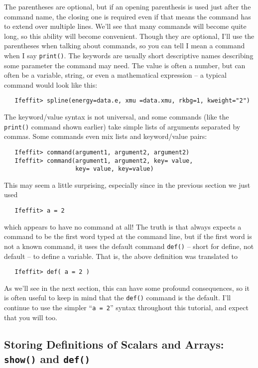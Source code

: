 \documentclass[11pt]{article}
\begin{document}
The parentheses are optional, but if an opening parenthesis is used just
after the command name, the closing one is required even if that means the
command has to extend over multiple lines.  We'll see that many commands
will become quite long, so this ability will become convenient.  Though
they are optional, I'll use the parentheses when talking about commands, so
you can tell I mean a command when I say {\tt{print()}}.  The keywords are
usually short descriptive names describing some parameter the command may
need.  The value is often a number, but can often be a variable, string, or
even a mathematical expression -- a typical command would look like this:
{\small\begin{verbatim}
   Ifeffit> spline(energy=data.e, xmu =data.xmu, rkbg=1, kweight="2")
\end{verbatim}}
\noindent
The {{keyword/value}} syntax is not universal, and some commands (like the
{\tt{print()}} command shown earlier) take simple lists of arguments
separated by commas.  Some commands even mix lists and {{keyword/value}}
pairs:
{\small\begin{verbatim}
   Ifeffit> command(argument1, argument2, argument2)
   Ifeffit> command(argument1, argument2, key= value, 
                    key= value, key=value)
\end{verbatim}}
\noindent
This may seem a little surprising, especially since in the previous section
we just used  
{\small\begin{verbatim}
   Ifeffit> a = 2
\end{verbatim}}
\noindent
which appears to have no command at all!  The truth is that {\ifeffit} 
always expects a command to be the first word typed at the command line, 
but if the first word is not a known command, it uses the default command
{\tt{def()}} -- short for define, not default -- to  define a variable. 
That is, the above definition was translated to 
{\small\begin{verbatim}
   Ifeffit> def( a = 2 )
\end{verbatim}}
\noindent
As we'll see in the next section, this can have some profound consequences,
so it is often useful to keep in mind that the {\tt{def()}} command is the
default.  I'll continue to use the simpler ``{\tt a = 2}'' syntax
throughout this tutorial, and expect that you will too.

\subsection{Storing Definitions of Scalars and Arrays: 
  {\tt{show()}} and {\tt{def()}}}\label{s:datatypes:setdef}
\end{document}
